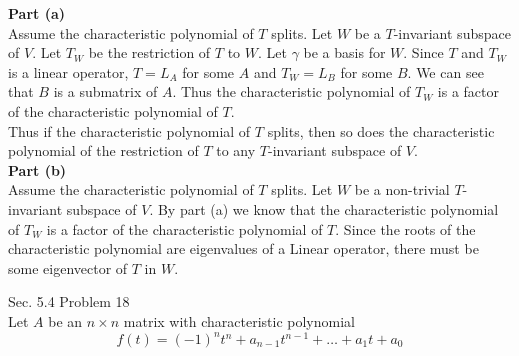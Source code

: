 \documentclass[answers,12pt,addpoints]{exam}
\begin{document}
\begin{questions}
    \begin{solution}
        \textbf{Part (a)}\\
        Assume the characteristic polynomial of $T$ splits. Let $W$ be a $T$-invariant subspace of $V$. Let $T_W$ be the restriction of $T$ to $W$. Let $\gamma$ be a basis for $W$. Since $T$ and $T_W$ is a linear operator, $T = L_A$ for some $A$ and $T_W = L_B$ for some $B$. We can see that $B$ is a submatrix of $A$. Thus the characteristic polynomial of $T_W$ is a factor of the characteristic polynomial of $T$.\\
        Thus if the characteristic polynomial of $T$ splits, then so does the characteristic polynomial of the restriction of $T$ to any $T$-invariant subspace of $V$.\\
        \textbf{Part (b)}\\
        Assume the characteristic polynomial of $T$ splits. Let $W$ be a non-trivial $T$-invariant subspace of $V$. By part (a) we know that the characteristic polynomial of $T_W$ is a factor of the characteristic polynomial of $T$. Since the roots of the characteristic polynomial are eigenvalues of a Linear operator, there must be some eigenvector of $T$ in $W$.
    \end{solution}
    \question Sec. 5.4 Problem 18\\
    Let $A$ be an $n \times n$ matrix with characteristic polynomial 
    $$f(t) = (-1)^n t^n + a_{n-1}t^{n-1} + \dots + a_1 t + a_0 $$
\end{questions}
\end{document}
